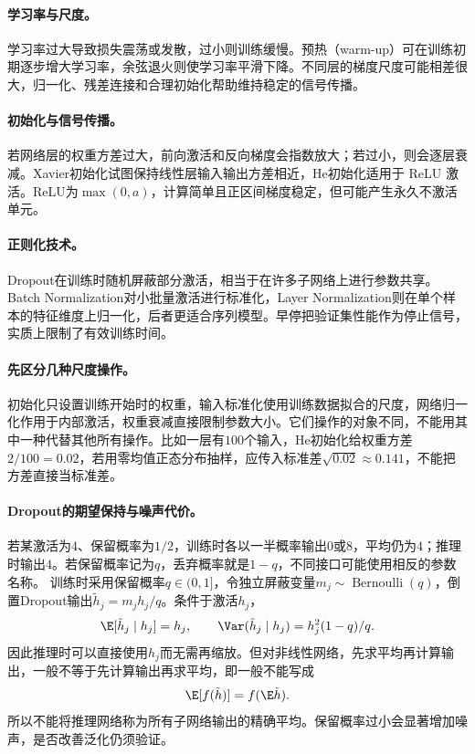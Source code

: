 \paragraph{学习率与尺度。}
学习率过大导致损失震荡或发散，过小则训练缓慢。预热（warm-up）可在训练初期逐步增大学习率，余弦退火则使学习率平滑下降。不同层的梯度尺度可能相差很大，归一化、残差连接和合理初始化帮助维持稳定的信号传播。

\paragraph{初始化与信号传播。}
若网络层的权重方差过大，前向激活和反向梯度会指数放大；若过小，则会逐层衰减。Xavier初始化试图保持线性层输入输出方差相近，He初始化适用于 ReLU 激活。ReLU为$\max(0,a)$，计算简单且正区间梯度稳定，但可能产生永久不激活单元。

\paragraph{正则化技术。}
Dropout在训练时随机屏蔽部分激活，相当于在许多子网络上进行参数共享。Batch Normalization对小批量激活进行标准化，Layer Normalization则在单个样本的特征维度上归一化，后者更适合序列模型。早停把验证集性能作为停止信号，实质上限制了有效训练时间。

\paragraph{先区分几种尺度操作。}
初始化只设置训练开始时的权重，输入标准化使用训练数据拟合的尺度，网络归一化作用于内部激活，权重衰减直接限制参数大小。它们操作的对象不同，不能用其中一种代替其他所有操作。比如一层有$100$个输入，He初始化给权重方差$2/100=0.02$，若用零均值正态分布抽样，应传入标准差$\sqrt{0.02}\approx0.141$，不能把方差直接当标准差。

\paragraph{Dropout的期望保持与噪声代价。}
若某激活为$4$、保留概率为$1/2$，训练时各以一半概率输出$0$或$8$，平均仍为$4$；推理时输出$4$。若保留概率记为$q$，丢弃概率就是$1-q$，不同接口可能使用相反的参数名称。
训练时采用保留概率$q\in(0,1]$，令独立屏蔽变量$m_j\sim\operatorname{Bernoulli}(q)$，倒置Dropout输出$\tilde h_j=m_jh_j/q$。条件于激活$h_j$，
\begin{equation}
 \E[\tilde h_j\mid h_j]=h_j,\qquad
 \Var(\tilde h_j\mid h_j)=h_j^2(1-q)/q.
\end{equation}
因此推理时可以直接使用$h_j$而无需再缩放。但对非线性网络，先求平均再计算输出，一般不等于先计算输出再求平均，即一般不能写成
\[
 \E[f(\tilde h)]=f(\E\tilde h).
\]
所以不能将推理网络称为所有子网络输出的精确平均。保留概率过小会显著增加噪声，是否改善泛化仍须验证。

